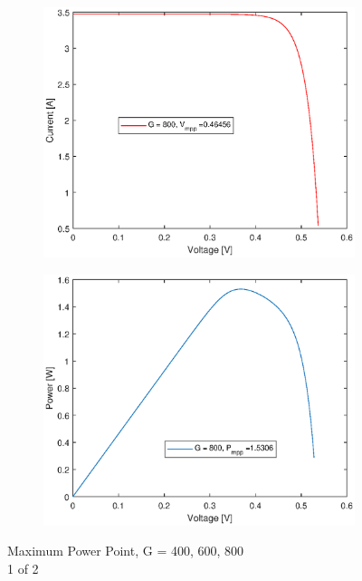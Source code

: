 \begin{figure}[H]
\begin{center}
\begin{subfigure}{0.4\textwidth}
\begin{center}
				\end{center}	
			\end{subfigure}
			\begin{subfigure}{0.4\textwidth}
				\begin{center}
					\includegraphics[width=1\textwidth]{figures/vg800.eps}
				\end{center}	
			\end{subfigure}
			\begin{subfigure}{0.4\textwidth}
				\begin{center}
					\includegraphics[width=1\textwidth]{figures/pg800.eps}
				\end{center}	
			\end{subfigure}
			\caption{Maximum Power Point, G = 400, 600, 800\\ 1 of 2}
			\label{fig:max1}
		\end{center}
		\end{figure}
	
